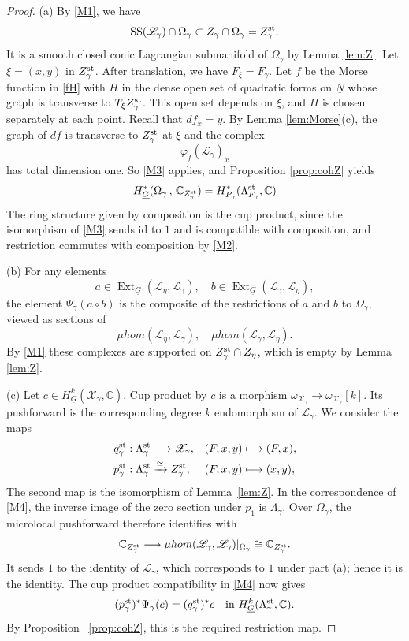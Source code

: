 \documentclass[11pt,reqno]{amsart}
\theoremstyle{definition}
\theoremstyle{remark}
\def\bbC{\mathbb C}
\def\dN{\underline N}
\def\dG{\underline G}
\def\scrX{\mathscr X}
\def\Ext{\operatorname{Ext}}
\def\muhom{\mu hom}
\begin{document}
\begin{proof}\hfill

(a) By \ref{M1}, we have
$$\operatorname{SS}(\mathscr L_\gamma)\cap\Omega_\gamma\subset Z_\gamma\cap\Omega_\gamma=Z^{\rm st}_\gamma.$$ 
It is a smooth closed conic Lagrangian submanifold of $\Omega_\gamma$
by Lemma \ref{lem:Z}. 
Let $\xi=(x,y)$ in $Z^{\rm st}_\gamma$.
After translation, we have $F_\xi=F_\gamma$. 
Let $f$ be the Morse function in \eqref{fH} with $H$ in the dense open set of quadratic
forms on $\dN$ whose graph  is transverse to $T_\xi Z^{\rm st}_\gamma$. 
This open set depends on $\xi$, and $H$ is chosen separately at each point. 
Recall that $df_x=y$. By Lemma \ref{lem:Morse}(c), the
graph of $df$ is transverse to $Z^{\rm st}_\gamma$ at $\xi$ and the complex
$$\varphi_f(\mathscr L_\gamma)_x$$ has total dimension one. So \ref{M3}
applies, and Proposition \ref{prop:cohZ} yields
$$H^*_{\dG}(\Omega_\gamma\,,\,\bbC_{Z^{\rm st}_\gamma})=
H^*_{P_\gamma}(\Lambda^{\rm st}_{F_\gamma},\bbC)$$ 
The ring
structure given by composition is the cup product, since the isomorphism of \ref{M3} sends $\mathrm{id}$ to $1$ and is compatible with
composition, and restriction commutes with composition by \ref{M2}.

(b) For any elements
$$a\in\Ext_{\dG}(\mathscr L_\eta,\mathscr L_\gamma),\quad b\in\Ext_{\dG}(\mathscr L_\gamma,\mathscr L_\eta),$$
the element $\Psi_\gamma(a\circ b)$ is the composite of the restrictions of $a$
and $b$ to $\Omega_\gamma$, 
viewed as sections of 
$$\muhom(\mathscr L_\eta,\mathscr L_\gamma),\quad\muhom(\mathscr L_\gamma,\mathscr L_\eta).$$
By \ref{M1} these complexes are supported on
$Z^{\rm st}_\gamma\cap Z_\eta$, which is empty by Lemma \ref{lem:Z}.

(c) Let $c\in H^k_{\dG}(\scrX_\gamma,\bbC)$. Cup product by $c$
is a morphism $\omega_{\scrX_\gamma}\to\omega_{\scrX_\gamma}[k]$.
Its pushforward is the corresponding degree $k$ endomorphism
of $\mathscr L_\gamma$. We consider the maps
\[
\begin{aligned}
 q_\gamma^{\rm st}:\Lambda_\gamma^{\rm st}&\longrightarrow\scrX_\gamma,
 & (F,x,y)&\longmapsto(F,x),\\
 p_\gamma^{\rm st}:\Lambda_\gamma^{\rm st}&\xrightarrow{\cong}Z_\gamma^{\rm st},
 & (F,x,y)&\longmapsto(x,y),
\end{aligned}
\]
The second map is the isomorphism of Lemma~\ref{lem:Z}.
In the correspondence of \ref{M4}, the inverse image of the zero
section under $p_1$ is $\Lambda_\gamma$. Over $\Omega_\gamma$, the
microlocal pushforward therefore identifies with
\[
 \bbC_{Z_\gamma^{\rm st}}
 \longrightarrow
 \muhom(\mathscr L_\gamma,\mathscr L_\gamma)|_{\Omega_\gamma}
 \cong\bbC_{Z_\gamma^{\rm st}}.
\]
It sends $1$ to the identity of $\mathscr L_\gamma$, which corresponds
to $1$ under part (a); hence it is the identity. The cup product
compatibility in \ref{M4} now gives
\[
 (p_\gamma^{\rm st})^*\Psi_\gamma(c)
   =(q_\gamma^{\rm st})^*c
 \quad\text{in }H^k_{\dG}(\Lambda_\gamma^{\rm st},\bbC).
\]
By Proposition ~\ref{prop:cohZ}, this is the required restriction map.


\end{proof}
\end{document}
